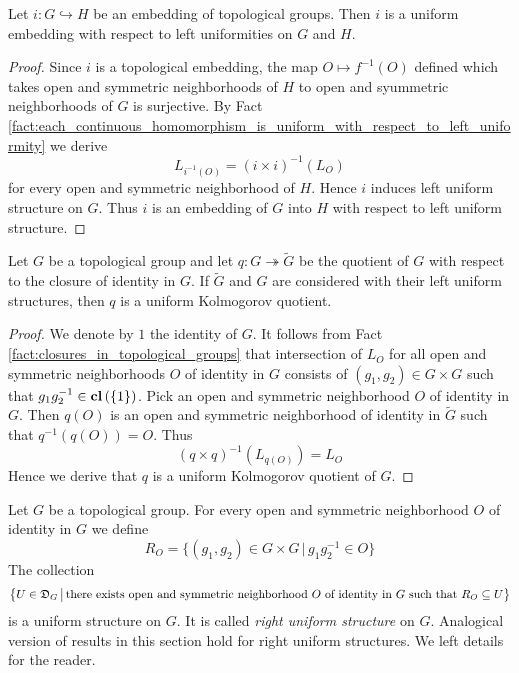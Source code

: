 \documentclass[10pt]{amsart}
\begin{document}
\begin{corollary}\label{corollary:topological_groups_embeddings_is_uniform_embedding}
	Let $i:G\hookrightarrow H$ be an embedding of topological groups. Then $i$ is a uniform embedding with respect to left uniformities on $G$ and $H$.
\end{corollary}
\begin{proof}
	Since $i$ is a topological embedding, the map $O\mapsto f^{-1}(O)$ defined which takes open and symmetric neighborhoods of $H$ to open and syummetric neighborhoods of $G$ is surjective. By Fact \ref{fact:each_continuous_homomorphism_is_uniform_with_respect_to_left_uniformity} we derive
	$$L_{i^{-1}(O)} = \left(i\times i\right)^{-1}(L_O)$$
	for every open and symmetric neighborhood of $H$. Hence $i$ induces left uniform structure on $G$. Thus $i$ is an embedding of $G$ into $H$ with respect to left uniform structure.
\end{proof}

\begin{corollary}\label{corollary:uniform_Kolmogorov_quotients_of_topological_groups}
	Let $G$ be a topological group and let $q:G\twoheadrightarrow \tilde{G}$ be the quotient of $G$ with respect to the closure of identity in $G$. If $\tilde{G}$ and $G$ are considered with their left uniform structures, then $q$ is a uniform Kolmogorov quotient.
\end{corollary}
\begin{proof}
	We denote by $1$ the identity of $G$. It follows from Fact \ref{fact:closures_in_topological_groups} that intersection of $L_O$ for all open and symmetric neighborhoods $O$ of identity in $G$ consists of $(g_1,g_2) \in G\times G$ such that $g_1g_2^{-1} \in \mathbf{cl}\left(\{1\}\right)$. Pick an open and symmetric neighborhood $O$ of identity in $G$. Then $q(O)$ is an open and symmetric neighborhood of identity in $\tilde{G}$ such that $q^{-1}(q(O)) = O$. Thus
	$$\left(q \times q\right)^{-1}(L_{q(O)}) = L_O$$
	Hence we derive that $q$ is a uniform Kolmogorov quotient of $G$.
\end{proof}

\begin{remark}\label{remark:right_uniform_structure}
	Let $G$ be a topological group. For every open and symmetric neighborhood $O$ of identity in $G$ we define
	$$R_O = \big\{(g_1,g_2)\in G\times G\,\big|\,g_1g_2^{-1} \in O\big\}$$
	The collection
	$$\big\{U \in {\mathfrak D}_G\,\big|\,\mbox{there exists open and symmetric neighborhood }O\mbox{ of identity in }G\mbox{ such that }R_O\subseteq U\big\}$$
	is a uniform structure on $G$. It is called \textit{right uniform structure} on $G$. Analogical version of results in this section hold for right uniform structures. We left details for the reader.
\end{remark}
\end{document}
